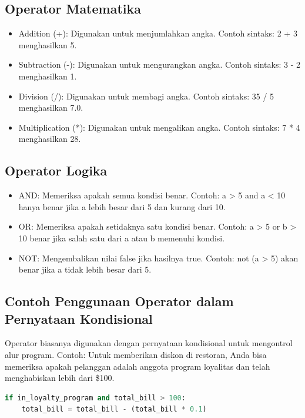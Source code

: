 \documentclass{article}
\begin{document}
\subsection{Operator Matematika}
\begin{itemize}
    \item Addition (+): Digunakan untuk menjumlahkan angka. Contoh sintaks: 2 + 3 menghasilkan 5.
    \item Subtraction (-): Digunakan untuk mengurangkan angka. Contoh sintaks: 3 - 2 menghasilkan 1.
    \item Division (/): Digunakan untuk membagi angka. Contoh sintaks: 35 / 5 menghasilkan 7.0.
    \item Multiplication (*): Digunakan untuk mengalikan angka. Contoh sintaks: 7 * 4 menghasilkan 28.
\end{itemize}

\subsection{Operator Logika}
\begin{itemize}
    \item AND: Memeriksa apakah semua kondisi benar. Contoh: a > 5 and a < 10 hanya benar jika a lebih besar dari 5 dan kurang dari 10.
    \item OR: Memeriksa apakah setidaknya satu kondisi benar. Contoh: a > 5 or b > 10 benar jika salah satu dari a atau b memenuhi kondisi.
    \item NOT: Mengembalikan nilai false jika hasilnya true. Contoh: not (a > 5) akan benar jika a tidak lebih besar dari 5.
\end{itemize}

\subsection{Contoh Penggunaan Operator dalam Pernyataan Kondisional}
Operator biasanya digunakan dengan pernyataan kondisional untuk mengontrol alur program. Contoh: Untuk memberikan diskon di restoran, Anda bisa memeriksa apakah pelanggan adalah anggota program loyalitas dan telah menghabiskan lebih dari \$100.
\begin{lstlisting}[language=Python, caption={}, captionpos=b]
if in_loyalty_program and total_bill > 100:
    total_bill = total_bill - (total_bill * 0.1)
\end{lstlisting}
\end{document}
